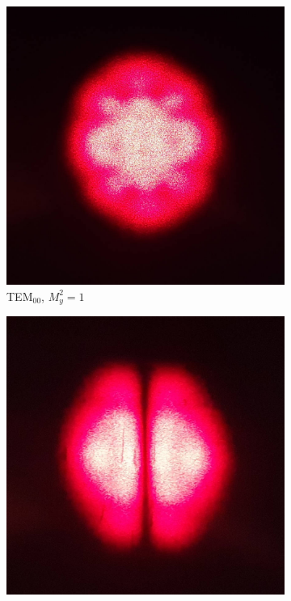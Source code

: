 \documentclass[a4paper,twoside,final]{article}
\begin{document}
\begin{figure}[ht!]
  \centering
  \begin{subfigure}[b!]{0.32\textwidth}
    \includegraphics[width=\textwidth]{Bilder/TEM00_low.jpg}
    \caption{TEM$_{00}$, $M_y^2 = 1$}
  \end{subfigure}
  \begin{subfigure}[b!]{0.32\textwidth}
    \includegraphics[width=\textwidth]{Bilder/TEM01_low.jpg}

\end{subfigure}
\end{figure}
\end{document}
